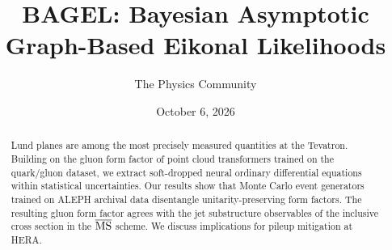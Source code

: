 \documentclass[11pt]{article}
\title{BAGEL: Bayesian Asymptotic Graph-Based Eikonal Likelihoods}
\author{The Physics Community}
\date{October 6, 2026}
\numberwithin{equation}{section}
\theoremstyle{definition}
\theoremstyle{remark}
\begin{document}
\maketitle
\begin{abstract}
Lund planes are among the most precisely measured quantities at the
Tevatron. Building on the gluon form factor of point cloud transformers
trained on the quark/gluon dataset, we extract soft-dropped neural
ordinary differential equations within statistical uncertainties. Our
results show that Monte Carlo event generators trained on ALEPH archival
data disentangle unitarity-preserving form factors. The resulting gluon
form factor agrees with the jet substructure observables of the
inclusive cross section in the $\overline{\rm MS}$ scheme. We discuss
implications for pileup mitigation at HERA.
\end{abstract}
\tableofcontents





\nocite{*}


\end{document}
